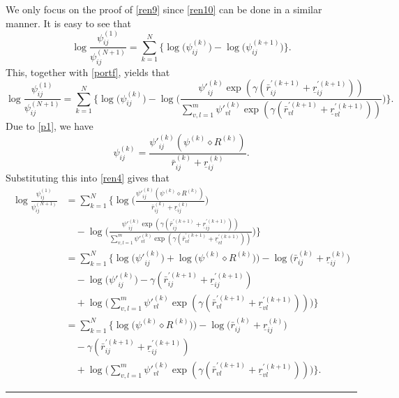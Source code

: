 \documentclass[11pt]{article}
\newcommand{\fin}{\hspace*{\fill}\rule{0.3em}{1ex}}
\newenvironment{proof}{{\bf \noindent Proof.}}{\fin}
\numberwithin{equation}{section}
\begin{document}
 
\begin{proof}
We only focus on the proof of \eqref{ren9} since \eqref{ren10}  can be done in a similar manner. 
It is easy to see that 
\begin{equation*}
\log\frac{\psi^{(1)}_{ij}}{\psi^{(N+1)}_{ij}}=\sum_{k=1}^N\Big\{\log\Big(\psi^{(k)}_{ij}\Big)-\log\Big(\psi^{(k+1)}_{ij}\Big)\Big\}.
\end{equation*}
This, together with \eqref{portf}, yields that 
\begin{equation}\label{ren4}
\log\frac{\psi^{(1)}_{ij}}{\psi^{(N+1)}_{ij}}=\sum_{k=1}^N\bigg\{\log\Big(\psi^{(k)}_{ij}\Big)-\log\bigg(\frac{\psi'^{(k)}_{ij}\exp(\gamma (\bar r_{ij}^{'(k+1)}+\underline r_{ij}^{'(k+1)}))}{\sum_{v,l=1}^{m}\psi'^{(k)}_{vl}\exp(\gamma (\bar r_{vl}^{'(k+1)}+\underline r_{vl}^{'(k+1)}))}\bigg)\bigg\}.
\end{equation}
Due to  \eqref{p1}, we have 
$$\psi^{(k)}_{ij}=\frac{{\psi'}^{(k)}_{ij}(\psi^{(k)}\diamond R^{(k)})}{\bar r^{(k)}_{ij}+\underline r^{(k)}_{ij}}.$$
Substituting this into \eqref{ren4} gives that 
\begin{equation} \label{ren5}
\begin{split}
\log\frac{\psi^{(1)}_{ij}}{\psi^{(N+1)}_{ij}}&=\sum_{k=1}^N\bigg\{\log\bigg(\frac{{\psi'}^{(k)}_{ij}(\psi^{(k)}\diamond R^{(k)})}{\bar r^{(k)}_{ij}+\underline r^{(k)}_{ij}}\bigg)\\
&\quad-\log\bigg(\frac{\psi'^{(k)}_{ij}\exp(\gamma (\bar r_{ij}^{'(k+1)}+\underline r_{ij}^{'(k+1)}))}{\sum_{v,l=1}^{m}\psi'^{(k)}_{vl}\exp(\gamma (\bar r_{vl}^{'(k+1)}+\underline r_{vl}^{'(k+1)}))}\bigg)\bigg\}\\
&=\sum_{k=1}^N\bigg\{\log\bigg({\psi'}^{(k)}_{ij}\bigg)+\log\bigg(\psi^{(k)}\diamond R^{(k)})\bigg)-\log\bigg(\bar r^{(k)}_{ij}+\underline r^{(k)}_{ij}\bigg)\\
&\quad-\log\bigg({\psi'}^{(k)}_{ij}\bigg)-\gamma (\bar r_{ij}^{'(k+1)}+\underline r_{ij}^{'(k+1)})\\
&\quad+\log\bigg(\sum_{v,l=1}^{m}\psi'^{(k)}_{vl}\exp(\gamma (\bar r_{vl}^{'(k+1)}+\underline r_{vl}^{'(k+1)}))\bigg)\bigg\}\\
&=\sum_{k=1}^N\bigg\{\log\bigg(\psi^{(k)}\diamond R^{(k)})\bigg)-\log\bigg(\bar r^{(k)}_{ij}+\underline r^{(k)}_{ij}\bigg)\\
&\quad-\gamma (\bar r_{ij}^{'(k+1)}+\underline r_{ij}^{'(k+1)})\\
&\quad+\log\bigg(\sum_{v,l=1}^{m}\psi'^{(k)}_{vl}\exp(\gamma (\bar r_{vl}^{'(k+1)}+\underline r_{vl}^{'(k+1)}))\bigg)\bigg\}.
\end{split}

\end{equation}
\end{proof}
\end{document}
